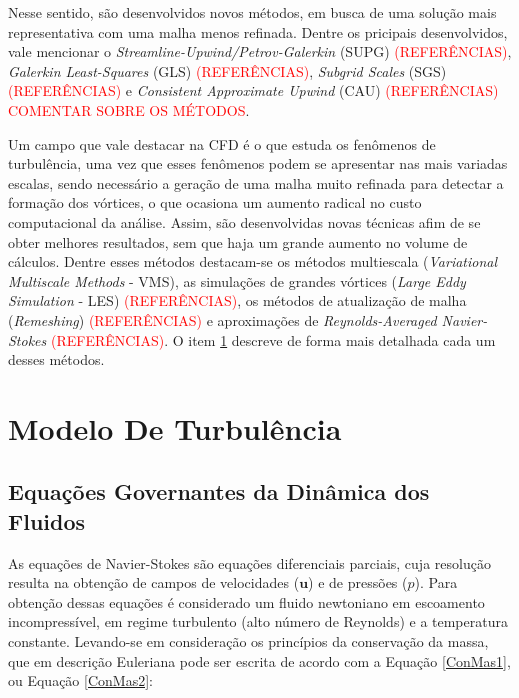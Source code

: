 \documentclass[_ArquivoPrincipal.tex]{subfiles}
\begin{document}
Nesse sentido, são desenvolvidos novos métodos, em busca de uma solução mais representativa com uma malha menos refinada. Dentre os pricipais desenvolvidos, vale mencionar o \textit{Streamline-Upwind/Petrov-Galerkin} (SUPG) \textcolor{red}{(REFERÊNCIAS)}, \textit{Galerkin Least-Squares} (GLS) \textcolor{red}{(REFERÊNCIAS)}, \textit{Subgrid Scales} (SGS) \textcolor{red}{(REFERÊNCIAS)} e \textit{Consistent Approximate Upwind} (CAU) \textcolor{red}{(REFERÊNCIAS)} \textcolor{red}{COMENTAR SOBRE OS MÉTODOS}.

Um campo que vale destacar na CFD é o que estuda os fenômenos de turbulência, uma vez que esses fenômenos podem se apresentar nas mais variadas escalas, sendo necessário a geração de uma malha muito refinada para detectar a formação dos vórtices, o que ocasiona um aumento radical no custo computacional da análise. Assim, são desenvolvidas novas técnicas afim de se obter melhores resultados, sem que haja um grande aumento no volume de cálculos. Dentre esses métodos destacam-se os métodos multiescala (\textit{Variational Multiscale Methods} - VMS), as simulações de grandes vórtices (\textit{Large Eddy Simulation} - LES) \textcolor{red}{(REFERÊNCIAS)}, os métodos de atualização de malha (\textit{Remeshing}) \textcolor{red}{(REFERÊNCIAS)} e aproximações de \textit{Reynolds-Averaged Navier-Stokes} \textcolor{red}{(REFERÊNCIAS)}. O item \ref{MT} descreve de forma mais detalhada cada um desses métodos.

\section{Modelo De Turbulência} \label{MT}

\subsection{Equações Governantes da Dinâmica dos Fluidos} \label{EqGov}

As equações de Navier-Stokes são equações diferenciais parciais, cuja resolução resulta na obtenção de campos de velocidades ($\mathbf{u}$) e de pressões ($p$). Para obtenção dessas equações é considerado um fluido newtoniano em escoamento incompressível, em regime turbulento (alto número de Reynolds) e a temperatura constante. Levando-se em consideração os princípios da conservação da massa, que em descrição Euleriana pode ser escrita de acordo com a Equação \ref{ConMas1}, ou Equação \ref{ConMas2}:
\end{document}

